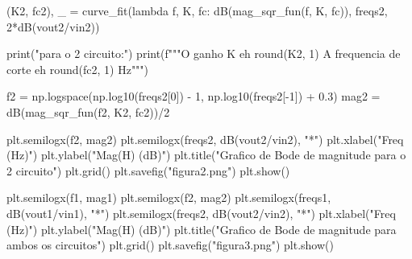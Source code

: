 \begin{python}
    (K2, fc2), _ = curve_fit(lambda f, K, fc: dB(mag_sqr_fun(f, K, fc)),
    freqs2, 2*dB(vout2/vin2))

    print("\n\nResultados para o 2 circuito:\n")
    print(f"""O ganho K eh {round(K2, 1)}
    A frequencia de corte eh {round(fc2, 1)} Hz""")

    f2 = np.logspace(np.log10(freqs2[0]) - 1, np.log10(freqs2[-1]) + 0.3)
    mag2 = dB(mag_sqr_fun(f2, K2, fc2))/2

    plt.semilogx(f2, mag2)
    plt.semilogx(freqs2, dB(vout2/vin2), "*")
    plt.xlabel("Freq (Hz)")
    plt.ylabel("Mag(H) (dB)")
    plt.title("Grafico de Bode de magnitude para o 2 circuito")
    plt.grid()
    plt.savefig("figura2.png")
    plt.show()




    plt.semilogx(f1, mag1)
    plt.semilogx(f2, mag2)
    plt.semilogx(freqs1, dB(vout1/vin1), "*")
    plt.semilogx(freqs2, dB(vout2/vin2), "*")
    plt.xlabel("Freq (Hz)")
    plt.ylabel("Mag(H) (dB)")
    plt.title("Grafico de Bode de magnitude para ambos os circuitos")
    plt.grid()
    plt.savefig("figura3.png")
    plt.show()

\end{python}